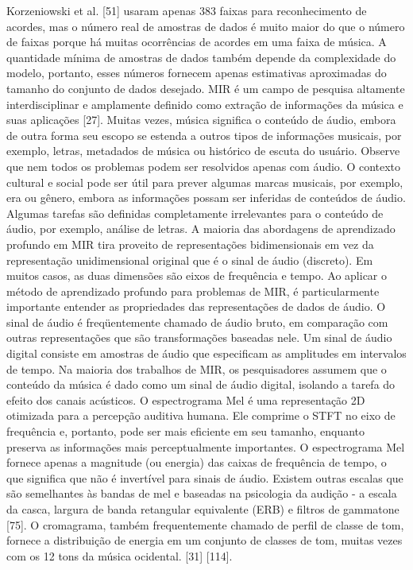 \documentclass{article}
\begin{document}
Korzeniowski et al. [51] usaram apenas 383 faixas para reconhecimento de acordes, mas o número real de amostras de dados é muito maior do que o número de faixas porque há muitas ocorrências de acordes em uma faixa de música. A quantidade mínima de amostras de dados também depende da complexidade do modelo, portanto, esses números fornecem apenas estimativas aproximadas do tamanho do conjunto de dados desejado.
MIR é um campo de pesquisa altamente interdisciplinar e amplamente definido como extração de informações da música e suas aplicações [27]. Muitas vezes, música significa o conteúdo de áudio, embora de outra forma seu escopo se estenda a outros tipos de informações musicais, por exemplo, letras, metadados de música ou histórico de escuta do usuário.
Observe que nem todos os problemas podem ser resolvidos apenas com áudio. O contexto cultural e social pode ser útil para prever algumas marcas musicais, por exemplo, era ou gênero, embora as informações possam ser inferidas de conteúdos de áudio. Algumas tarefas são definidas completamente irrelevantes para o conteúdo de áudio, por exemplo, análise de letras.
A maioria das abordagens de aprendizado profundo em MIR tira proveito de representações bidimensionais em vez da representação unidimensional original que é o sinal de áudio (discreto). Em muitos casos, as duas dimensões são eixos de frequência e tempo. Ao aplicar o método de aprendizado profundo para problemas de MIR, é particularmente importante entender as propriedades das representações de dados de áudio.
O sinal de áudio é freqüentemente chamado de áudio bruto, em comparação com outras representações que são transformações baseadas nele. Um sinal de áudio digital consiste em amostras de áudio que especificam as amplitudes em intervalos de tempo. Na maioria dos trabalhos de MIR, os pesquisadores assumem que o conteúdo da música é dado como um sinal de áudio digital, isolando a tarefa do efeito dos canais acústicos.
O espectrograma Mel é uma representação 2D otimizada para a percepção auditiva humana. Ele comprime o STFT no eixo de frequência e, portanto, pode ser mais eficiente em seu tamanho, enquanto preserva as informações mais perceptualmente importantes. O espectrograma Mel fornece apenas a magnitude (ou energia) das caixas de frequência de tempo, o que significa que não é invertível para sinais de áudio. Existem outras escalas que são semelhantes às bandas de mel e baseadas na psicologia da audição - a escala da casca, largura de banda retangular equivalente (ERB) e filtros de gammatone [75].
O cromagrama, também frequentemente chamado de perfil de classe de tom, fornece a distribuição de energia em um conjunto de classes de tom, muitas vezes com os 12 tons da música ocidental. [31] [114].
\end{document}
